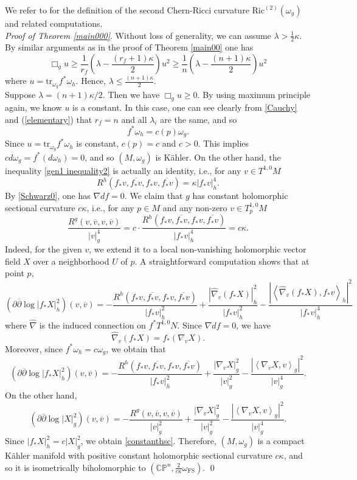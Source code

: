 \documentclass[12pt]{amsart}
\newcommand\bp{{\bar\partial}}
\theoremstyle{plain}
\theoremstyle{definition}
\newcommand{\p}{\partial}
\renewcommand{\bar}{\overline}
\newcommand{\beq}{\begin{equation}}
\newcommand{\eeq}{\end{equation}}
\renewcommand{\hat}{\widehat}
\renewcommand{\bp}{\bar{\partial}}
\renewcommand{\>}{\rightarrow}
\newcommand{\C}{{\mathbb C}}
\renewcommand{\P}{{\mathbb P}}
\newcommand{\LL}{\left\langle}
\newcommand{\RL}{\right\rangle}
\newcommand{\om}{\omega}
\numberwithin{equation}{section} %
\begin{document}
\baselineskip

\noindent  We refer to \cite{LY17} for  the definition of  the second Chern-Ricci  curvature $\mathrm{Ric}^{(2)}(\omega_g)$ and related computations.\\

\noindent\emph{Proof of Theorem \ref{main000}}.
Without loss of generality, we can assume
$
\lambda>\frac{1}{2}\kappa.
$
By similar arguments as in the proof of Theorem \ref{main00} one has   \beq \Box_g u \ge \frac{1}{r_f}\left(\lambda-\frac{(r_f+1)\kappa}{2}\right)u^2 \geq \frac{1}{n}\left(\lambda-  \frac{(n+1)\kappa}{2}\right)u^2\label{gen1 maximum0}\eeq
where $u=\mbox{tr}_{\omega_g} f^*\omega_h$. Hence,  $\lambda\leq   \frac{(n+1)\kappa}{2}$.\\



Suppose $\lambda=(n+1)\kappa/2$. Then we have $\Box_g u\ge 0$.
By using maximum principle again, we know $u$ is a constant.
In this case, one can see clearly from \eqref{Cauchy} and (\ref{elementary}) that $r_f=n$ and all $\lambda_i$ are the same,  and so $$f^*\omega_h =c(p)\omega_g.$$ Since $u=\mathrm{tr}_{\omega_g}f^*\omega_h$ is constant, $c(p)=c$ and $c>0$.
This implies $c d\om_g=f^*(d\om_h)=0$, and so $(M,\om_g)$ is K\"ahler. On the other hand, the inequality \eqref{gen1 inequality2} is actually an identity, i.e.,  for any $v\in T^{1,0}M$
\[
R^{h}\left(f_*v,\bar {f_*v}, f_*v,\bar {f_*v}\right)= \kappa |f_*v|^4_h.
\]
By \eqref{Schwarz0}, one has $\nabla df=0$.
We claim that  $g$  has constant holomorphic sectional curvature $c\kappa$, i.e.,  for any $p\in M$ and any non-zero $v\in T_p^{1,0}M$
\beq
\frac{R^g(v,\bar v,v,\bar v)}{|v|_g^4}=c\cdot \frac{R^{h}\left(f_*v,\bar {f_*v}, f_*v,\bar {f_*v}\right)}{|f_*v|^4_h}=c\kappa. \label{constanthsc}
\eeq
Indeed, for the given $v$, we extend it to a local non-vanishing holomorphic vector field $X$ over a neighborhood $U$ of $p$. A straightforward computation shows that at point $p$,
\beq \left(\p\bp\log |f_*X|^2_h\right)(v,\bar v)= -\frac{R^{h}\left(f_*v,\bar {f_*v}, f_*v,\bar {f_*v}\right)}{|f_*v|^2_h}
+\frac{\left|\hat\nabla_v(f_*X)\right|_{ h}^2}{|f_*v|^2_h}
-\frac{\left|\LL \hat\nabla_v(f_*X),f_*v\RL_{ h}\right|^2}{|f_*v|^4_h} \eeq
where $\hat\nabla$ is the induced connection on $f^*T^{1,0}N$. Since $\nabla df=0$,  we have $$\hat \nabla_v \left(f_* X\right)=f_*(\nabla_v X).$$
Moreover, since $f^*\omega_h= c\omega_g$, we obtain that
\beq \left(\p\bp\log |f_*X|^2_h\right)(v,\bar v)= -\frac{R^{h}\left(f_*v,\bar {f_*v}, f_*v,\bar {f_*v}\right)}{|f_*v|^2_h}
+\frac{\left|\nabla_vX\right|_{g}^2}{|v|^2_g}
-\frac{\left|\LL \nabla_vX,v\RL_g\right|^2}{|v|^4_g}. \eeq
On the other hand,
\beq \left(\p\bp\log |X|^2_g\right)(v,\bar v)=-\frac{R^{g}\left(v,\bar {v},v,\bar {v}\right)}{|v|^2_g}
+\frac{\left|\nabla_vX\right|_{g}^2}{|v|^2_g}
-\frac{\left|\LL \nabla_vX,v\RL_g\right|^2}{|v|^4_g}. \eeq
Since $|f_*X|^2_h=c|X|^2_g$, we obtain \eqref{constanthsc}.
Therefore,  $(M,\om_g)$ is a compact K\"ahler manifold with positive constant holomorphic sectional curvature $c\kappa$, and so it is isometrically biholomorphic to $\left(\C\P^n,\frac{2}{c\kappa}\om_{\mathrm{FS}}\right)$. \qed
\end{document}
